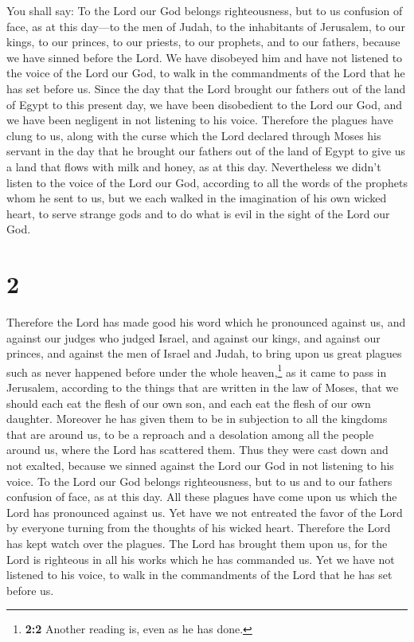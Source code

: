  You shall say: To the Lord our God belongs
righteousness, but to us confusion of face, as at this day---to the men
of Judah, to the inhabitants of Jerusalem,  to our kings,
to our princes, to our priests, to our prophets, and to our fathers,
 because we have sinned before the Lord. 
We have disobeyed him and have not listened to the voice of the Lord our
God, to walk in the commandments of the Lord that he has set before us.
 Since the day that the Lord brought our fathers out of
the land of Egypt to this present day, we have been disobedient to the
Lord our God, and we have been negligent in not listening to his voice.
 Therefore the plagues have clung to us, along with the
curse which the Lord declared through Moses his servant in the day that
he brought our fathers out of the land of Egypt to give us a land that
flows with milk and honey, as at this day.  Nevertheless
we didn't listen to the voice of the Lord our God, according to all the
words of the prophets whom he sent to us,  but we each
walked in the imagination of his own wicked heart, to serve strange gods
and to do what is evil in the sight of the Lord our God.

\hypertarget{section-1}{%
\section{2}\label{section-1}}

 Therefore the Lord has made good his word which he
pronounced against us, and against our judges who judged Israel, and
against our kings, and against our princes, and against the men of
Israel and Judah,  to bring upon us great plagues such as
never happened before under the whole heaven,\footnote{\textbf{2:2}
  Another reading is, even as he has done.} as it came to pass in
Jerusalem, according to the things that are written in the law of Moses,
 that we should each eat the flesh of our own son, and
each eat the flesh of our own daughter.  Moreover he has
given them to be in subjection to all the kingdoms that are around us,
to be a reproach and a desolation among all the people around us, where
the Lord has scattered them.  Thus they were cast down and
not exalted, because we sinned against the Lord our God in not listening
to his voice.  To the Lord our God belongs righteousness,
but to us and to our fathers confusion of face, as at this day.
 All these plagues have come upon us which the Lord has
pronounced against us.  Yet have we not entreated the
favor of the Lord by everyone turning from the thoughts of his wicked
heart.  Therefore the Lord has kept watch over the
plagues. The Lord has brought them upon us, for the Lord is righteous in
all his works which he has commanded us.  Yet we have not
listened to his voice, to walk in the commandments of the Lord that he
has set before us.

